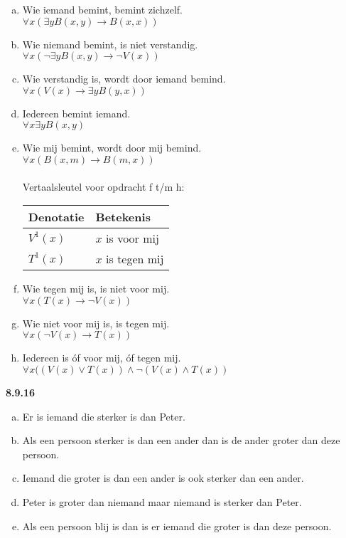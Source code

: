 \begin{enumerate}
\begin{enumerate}[(a)]
      \item
        Wie iemand bemint, bemint zichzelf.\\
        $\forall x ( \exists y B(x,y) \rightarrow B(x,x) )$
      \item
        Wie niemand bemint, is niet verstandig.\\
        $\forall x ( \neg \exists y B(x,y) \rightarrow \neg V(x))$
      \item
        Wie verstandig is, wordt door iemand bemind.\\
        $\forall x ( V(x) \to \exists y B(y,x))$
      \item
        Iedereen bemint iemand.\\
        $\forall x \exists y B(x,y)$
      \item
        Wie mij bemint, wordt door mij bemind.\\
        $\forall x ( B(x,m) \to B(m,x))$
        \\\\
        Vertaalsleutel voor opdracht f t/m h: \\
        \begin{tabular}{l|l}
          Denotatie & Betekenis\\
          \hline
          $V^1(x)$ & $x$ is voor mij\\
          $T^1(x)$ & $x$ is tegen mij\\
        \end{tabular}
      \item
        Wie tegen mij is, is niet voor mij.\\
        $\forall x ( T(x) \rightarrow \neg V(x) )$
      \item
        Wie niet voor mij is, is tegen mij.\\
        $\forall x ( \neg V(x) \rightarrow T(x) )$
      \item
        Iedereen is óf voor mij, óf tegen mij.\\
        $\forall x ( ( V(x) \vee T(x) ) \land \neg( V(x) \land T(x) )$
    \end{enumerate}
\end{enumerate}


\vspace{2mm}
\noindent \textbf{8.9.16}
\newline
\begin{enumerate}[(a)]
\item Er is iemand die sterker is dan Peter.
\item Als een persoon sterker is dan een ander dan is de ander groter dan deze persoon.
\item Iemand die groter is dan een ander is ook sterker dan een ander.
\item Peter is groter dan niemand maar niemand is sterker dan Peter.
\item Als een persoon blij is dan is er iemand die groter is dan deze persoon.
\end{enumerate}

	
